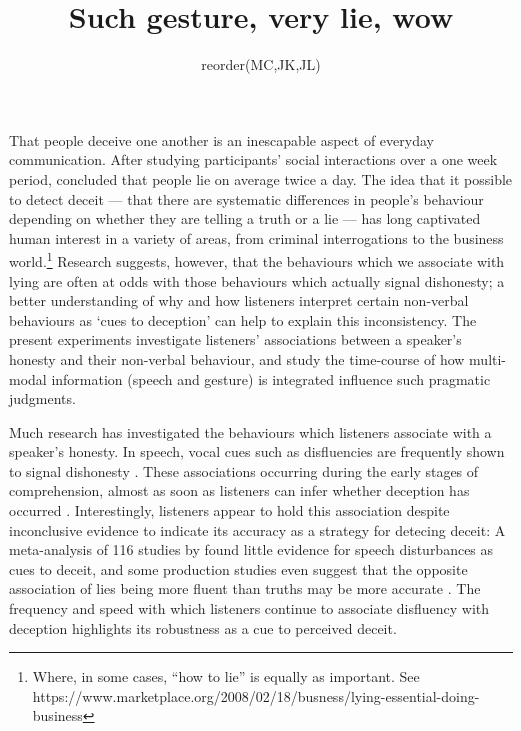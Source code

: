 \documentclass[a4paper,man,natbib]{apa6}
\title{Such gesture, very lie, wow}
\author{reorder(MC,JK,JL)}
\affiliation{Psychology, PPLS, University of Edinburgh}
\begin{document}
\maketitle

\noindent
That people deceive one another is an inescapable aspect of everyday communication.
After studying participants' social interactions over a one week period, \citet{DePaulo1996} concluded that people lie on average twice a day.
The idea that it possible to detect deceit --- that there are systematic differences in people's behaviour depending on whether they are telling a truth or a lie --- has long captivated human interest in a variety of areas, from criminal interrogations to the business world.\footnote{Where, in some cases, ``how to lie'' is equally as important. See https://www.marketplace.org/2008/02/18/busness/lying-essential-doing-business}
Research suggests, however, that the behaviours which we associate with lying are often at odds with those behaviours which actually signal dishonesty; a better understanding of why and how listeners interpret certain non-verbal behaviours as `cues to deception' can help to explain this inconsistency.
The present experiments investigate listeners' associations between a speaker's honesty and their non-verbal behaviour, and study the time-course of how multi-modal information (speech and gesture) is integrated influence such pragmatic judgments. 

Much research has investigated the behaviours which listeners associate with a speaker's honesty.
In speech, vocal cues such as disfluencies are frequently shown to signal dishonesty \citep{Zuckerman1981, Vrij2000}.
These associations occurring during the early stages of comprehension, almost as soon as listeners can infer whether deception has occurred \citep{Loy2017}.
Interestingly, listeners appear to hold this association despite inconclusive evidence to indicate its accuracy as a strategy for detecing deceit: A meta-analysis of 116 studies by \citet{DePaulo2003} found little evidence for speech disturbances as cues to deceit, and some production studies even suggest that the opposite association of lies being more fluent than truths may be more accurate \citep[e.g.][]{Arciuli2009, Benus2006}.
The frequency and speed with which listeners continue to associate disfluency with deception highlights its robustness as a cue to perceived deceit.
\end{document}
